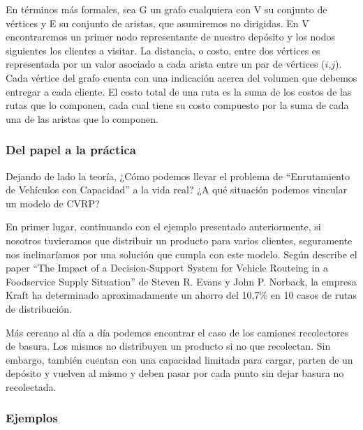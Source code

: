En términos más formales, sea G un grafo cualquiera con V su conjunto de vértices y E su conjunto de aristas, que asumiremos no dirigidas. En V encontraremos un primer nodo representante de nuestro depósito y los nodos siguientes los clientes a visitar. La distancia, o costo, entre dos vértices es representada por un valor asociado a cada arista entre un par de vértices ($i$,$j$). Cada vértice del grafo cuenta con una indicación acerca del volumen que debemos entregar a cada cliente. El costo total de una ruta es la suma de los costos de las rutas que lo componen, cada cual tiene su costo compuesto por la suma de cada una de las aristas que lo componen.

\subsubsection{Del papel a la práctica}
Dejando de lado la teoría, ¿Cómo podemos llevar el problema de ``Enrutamiento de Vehículos con Capacidad'' a la vida real? ¿A qué situación podemos vincular un modelo de CVRP?

\vskip 8pt

En primer lugar, continuando con el ejemplo presentado anteriormente, si nosotros tuvieramos que distribuir un producto para varios clientes, seguramente nos inclinaríamos por una solución que cumpla con este modelo. Según describe el paper ``The Impact of a Decision-Support System for Vehicle Routeing in a Foodservice Supply Situation'' de Steven R. Evans y John P. Norback, la empresa Kraft ha determinado aproximadamente un ahorro del 10,7\% en 10 casos de rutas de distribución.

\vskip 8pt

Más cercano al día a día podemos encontrar el caso de los camiones recolectores de basura. Los mismos no distribuyen un producto si no que recolectan. Sin embargo, también cuentan con una capacidad limitada para cargar, parten de un depósito y vuelven al mismo y deben pasar por cada punto sin dejar basura no recolectada.

\subsubsection{Ejemplos}